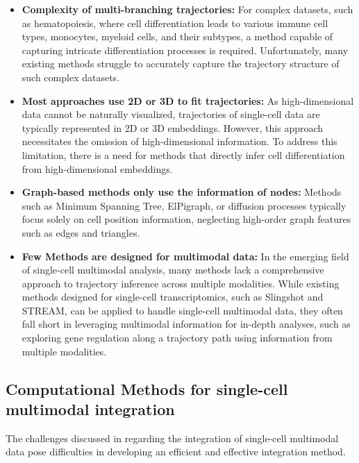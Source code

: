 \begin{itemize}
	\item \textbf{Complexity of multi-branching trajectories:} 
	For complex datasets, such as hematopoiesis, where cell differentiation leads to various immune cell types, monocytes, myeloid cells, and their subtypes, a method capable of capturing intricate differentiation processes is required. Unfortunately, many existing methods struggle to accurately capture the trajectory structure of such complex datasets.

	\item \textbf{Most approaches use 2D or 3D to fit trajectories:} 
	As high-dimensional data cannot be naturally visualized, trajectories of single-cell data are typically represented in 2D or 3D embeddings. However, this approach necessitates the omission of high-dimensional information. To address this limitation, there is a need for methods that directly infer cell differentiation from high-dimensional embeddings. 

	\item \textbf{Graph-based methods only use the information of nodes:} 
	Methods such as Minimum Spanning Tree, ElPigraph, or diffusion processes typically focus solely on cell position information, neglecting high-order graph features such as edges and triangles.   

	\item \textbf{Few Methods are designed for multimodal data:} 
	In the emerging field of single-cell multimodal analysis, many methods lack a comprehensive approach to trajectory inference across multiple modalities. While existing methods designed for single-cell transcriptomics, such as Slingshot and STREAM, can be applied to handle single-cell multimodal data, they often fall short in leveraging multimodal information for in-depth analyses, such as exploring gene regulation along a trajectory path using information from multiple modalities.
\end{itemize}


\subsection{Computational Methods for single-cell multimodal integration}
\label{background:sec2:integration}
The challenges discussed in  regarding the integration of single-cell multimodal data pose difficulties in developing an efficient and effective integration method. 

